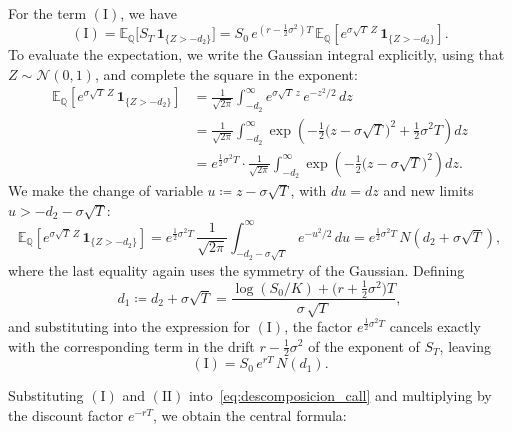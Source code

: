 \documentclass[11pt,a4paper,oneside]{report}
\theoremstyle{plain}
\theoremstyle{definition}
\theoremstyle{remark}
\newcommand{\E}{\mathbb{E}}
\newcommand{\Q}{\mathbb{Q}}
\newcommand{\1}{\mathbf{1}}
\newcommand{\eqdef}{\coloneqq}
\begin{document}
For the term $(\mathrm{I})$, we have
\begin{equation*}
  (\mathrm{I}) = \E_\Q\bigl[S_T\, \mathbf{1}_{\{Z > -d_2\}}\bigr]
              = S_0\, e^{(r - \frac{1}{2}\sigma^2) T}\,
                \E_\Q\!\left[e^{\sigma\sqrt{T}\, Z}\,
                              \mathbf{1}_{\{Z > -d_2\}}\right].
\end{equation*}
To evaluate the expectation, we write the Gaussian integral
explicitly, using that $Z \sim \mathcal{N}(0, 1)$, and complete the
square in the exponent:
\begin{align*}
  \E_\Q\!\left[e^{\sigma\sqrt{T}\, Z}\, \mathbf{1}_{\{Z > -d_2\}}\right]
  &= \frac{1}{\sqrt{2\pi}} \int_{-d_2}^{\infty}
       e^{\sigma\sqrt{T}\, z}\, e^{-z^2/2}\, dz \\
  &= \frac{1}{\sqrt{2\pi}} \int_{-d_2}^{\infty}
       \exp\!\left(-\tfrac{1}{2}\bigl(z - \sigma\sqrt{T}\bigr)^2
                   + \tfrac{1}{2}\sigma^2 T\right) dz \\
  &= e^{\frac{1}{2}\sigma^2 T} \cdot
     \frac{1}{\sqrt{2\pi}} \int_{-d_2}^{\infty}
       \exp\!\left(-\tfrac{1}{2}\bigl(z - \sigma\sqrt{T}\bigr)^2\right) dz.
\end{align*}
We make the change of variable $u \eqdef z - \sigma\sqrt{T}$, with
$du = dz$ and new limits $u > -d_2 - \sigma\sqrt{T}$:
\begin{equation*}
  \E_\Q\!\left[e^{\sigma\sqrt{T}\, Z}\, \mathbf{1}_{\{Z > -d_2\}}\right]
  = e^{\frac{1}{2}\sigma^2 T}\,
    \frac{1}{\sqrt{2\pi}} \int_{-d_2 - \sigma\sqrt{T}}^{\infty}
       e^{-u^2/2}\, du
  = e^{\frac{1}{2}\sigma^2 T}\, N(d_2 + \sigma\sqrt{T}),
\end{equation*}
where the last equality again uses the symmetry of the Gaussian.
Defining
\begin{equation}\label{eq:def_d1}
  d_1 \eqdef d_2 + \sigma\sqrt{T}
       = \frac{\log(S_0/K) + \bigl(r + \tfrac{1}{2}\sigma^2\bigr) T}
              {\sigma\, \sqrt{T}},
\end{equation}
and substituting into the expression for $(\mathrm{I})$, the factor
$e^{\frac{1}{2}\sigma^2 T}$ cancels exactly with the corresponding
term in the drift $r - \tfrac{1}{2}\sigma^2$ of the exponent of
$S_T$, leaving
\begin{equation}\label{eq:termino_I}
  (\mathrm{I}) = S_0\, e^{rT}\, N(d_1).
\end{equation}

Substituting
$(\mathrm{I})$ and $(\mathrm{II})$ into~\eqref{eq:descomposicion_call}
and multiplying by the discount factor $e^{-rT}$, we obtain the
central formula:
\end{document}
